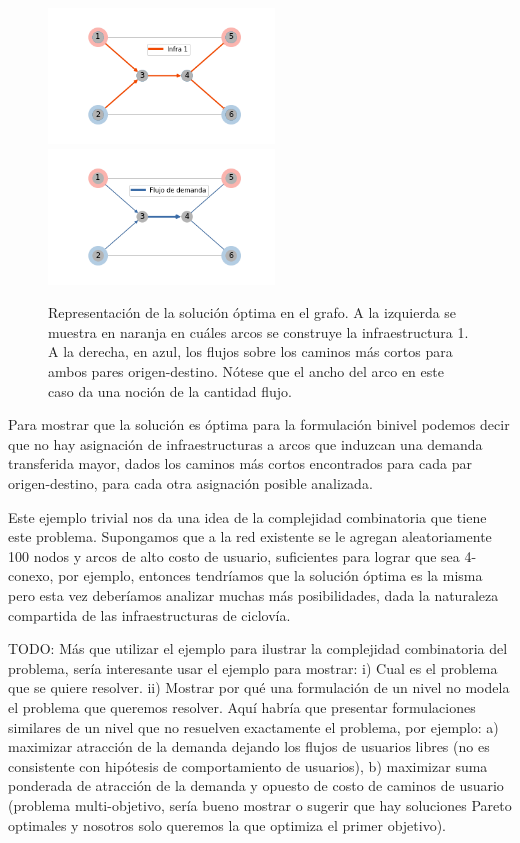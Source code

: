 \documentclass{article}
\begin{document}
  \begin{figure}[h!]
    \centering
    \includegraphics[width=6cm]{../resources/example_1_infras.png}
    \includegraphics[width=6cm]{../resources/example_1_flows.png}
    \caption{Representación de la solución óptima en el grafo. A la izquierda se muestra en naranja en cuáles arcos se construye la infraestructura 1. A la derecha, en azul, los flujos sobre los caminos más cortos para ambos pares origen-destino. Nótese que el ancho del arco en este caso da una noción de la cantidad flujo.}
    \label{fig:example1solution}
  \end{figure}

  Para mostrar que la solución es óptima para la formulación binivel podemos decir que no hay asignación de infraestructuras a arcos que induzcan una demanda transferida mayor, dados los caminos más cortos encontrados para cada par origen-destino, para cada otra asignación posible analizada.

  Este ejemplo trivial nos da una idea de la complejidad combinatoria que tiene este problema. Supongamos que a la red existente se le agregan aleatoriamente 100 nodos y arcos de alto costo de usuario, suficientes para lograr que sea 4-conexo, por ejemplo, entonces tendríamos que la solución óptima es la misma pero esta vez deberíamos analizar muchas más posibilidades, dada la naturaleza compartida de las infraestructuras de ciclovía.

  TODO:
  Más que utilizar el ejemplo para ilustrar la complejidad combinatoria del problema, sería interesante usar el ejemplo para mostrar:
  i) Cual es el problema que se quiere resolver.
  ii) Mostrar por qué una formulación de un nivel no modela el problema que queremos resolver. Aquí habría que presentar formulaciones similares de un nivel que no resuelven exactamente el problema, por ejemplo: a) maximizar atracción de la demanda dejando los flujos de usuarios libres (no es consistente con hipótesis de comportamiento de usuarios), b) maximizar suma ponderada de atracción de la demanda y opuesto de costo de caminos de usuario (problema multi-objetivo, sería bueno mostrar o sugerir que hay soluciones Pareto optimales y nosotros solo queremos la que optimiza el primer objetivo).
\end{document}
